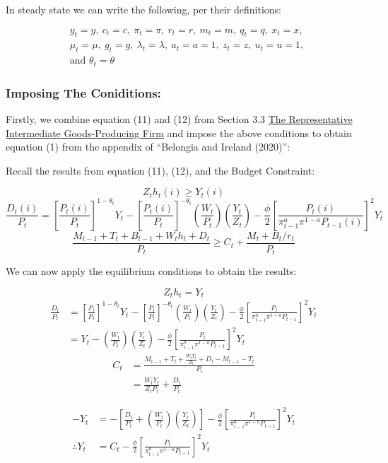 \documentclass[11pt,preprint, authoryear]{elsarticle}
\numberwithin{equation}{section}
\numberwithin{figure}{section}
\numberwithin{table}{section}
\begin{document}
In steady state we can write the following, per their definitions:

\[\begin{aligned} & y_{t}=y,\ c_{t}=c,\ \pi_{t}=\pi,\ r_{t}=r, \ m_{t}=m,\ q_{t}=q,\ x_{t}=x,\ \\ 
& \mu_{t}=\mu,\ g_{t}=g,\ \lambda_{t}=\lambda,\ a_{t}=a=1,\ z_{t}=z,\ u_{t}=u=1, \\ 
& \text {and } \theta_{t}=\theta \end{aligned}\]

\hypertarget{imposing-the-coniditions}{%
\subsubsection{Imposing The
Coniditions:}\label{imposing-the-coniditions}}

Firstly, we combine equation (11) and (12) from Section 3.3
\protect\hyperlink{the-representative-intermediate-goods-producing-firm}{The
Representative Intermediate Goods-Producing Firm} and impose the above
conditions to obtain equation (1) from the appendix of ``Belongia and
Ireland (2020)'':

Recall the results from equation (11), (12), and the Budget Constraint:

\[Z_th_t(i) \ge Y_t(i) \tag{11}\]
\[\frac{D_t(i)}{P_t}=[\frac{P_t(i)}{P_t}]^{1-\theta_t}Y_t-[\frac{P_t(i)}{P_t}]^{-\theta_t}(\frac{W_t}{P_t})(\frac{Y_t}{Z_t})-\frac{\phi}{2}[\frac{P_t(i)}{\pi_{t-1}^a \pi^{1-a}P_{t-1}(i)}]^2Y_t\tag{12}\]
\[\frac{M_{t-1}+T_{t}+B_{t-1}+W_{t} h_{t}+D_{t}}{P_{t}} \geq C_{t}+\frac{M_{t}+B_{t} / r_{t}}{P_{t}}\]

We can now apply the equilibrium conditions to obtain the results:

\[Z_th_t = Y_t \]
\[\begin{aligned} \frac{D_t}{P_t} & =[\frac{P_t}{P_t}]^{1-\theta_t}Y_t - [\frac{P_t}{P_t}]^{-\theta_t}(\frac{W_t}{P_t})(\frac{Y_t}{Z_t})-\frac{\phi}{2}[\frac{P_t}{\pi_{t-1}^a \pi^{1-a}P_{t-1}}]^2Y_t \\
& = Y_t - (\frac{W_t}{P_t})(\frac{Y_t}{Z_t}) - \frac{\phi}{2}[\frac{P_t}{\pi_{t-1}^a \pi^{1-a}P_{t-1}}]^2Y_t \end{aligned}\]
\[\begin{aligned} C_{t} &= \frac{M_{t-1}+T_{t}+\frac{W_tY_t}{Z_t}+D_{t} - M_{t-1} - T_t}{P_{t}}\\
& = \frac{W_tY_t}{Z_t P_t} + \frac{D_{t}}{P_t}
\end{aligned}\]

\[\begin{aligned} -Y_t  &= -\left[ \frac{D_t}{P_t} + (\frac{W_t}{P_t})(\frac{Y_t}{Z_t}) \right] - \frac{\phi}{2}[\frac{P_t}{\pi_{t-1}^a \pi^{1-a}P_{t-1}}]^2Y_t \\
\therefore Y_t & = C_t - \frac{\phi}{2}[\frac{P_t}{\pi_{t-1}^a \pi^{1-a}P_{t-1}}]^2Y_t
\end{aligned}\]
\end{document}

